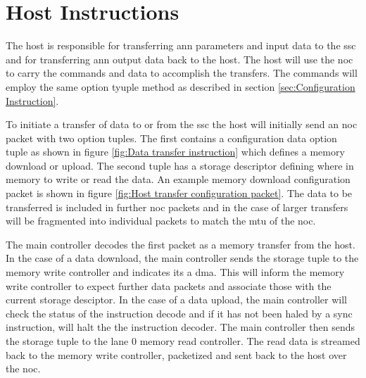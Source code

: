 \section{Host Instructions}
\label{sec:Host Instructions}

The host is responsible for transferring \ac{ann} parameters and input data to the \ac{ssc} and for transferring \ac{ann} output data back to the host.
The host will use the \ac{noc} to carry the commands and data to accomplish the transfers.
The commands will employ the same option tyuple method as described in section \ref{sec:Configuration Instruction}.

To initiate a transfer of data to or from the \ac{ssc} the host will initially send an \ac{noc} packet with two option tuples.
The first contains a configuration data option tuple as shown in figure \ref{fig:Data transfer instruction} which defines a memory download or upload.
The second tuple has a storage descriptor defining where in memory to write or read the data.
An example memory download configuration packet is shown in figure \ref{fig:Host transfer configuration packet}.
The data to be transferred is included in further \ac{noc} packets and in the case of larger transfers will be fragmented into individual packets to match the \ac{mtu} of the \ac{noc}.

The main controller decodes the first packet as a memory transfer from the host. 
In the case of a data download, the main controller sends the storage tuple to the memory write controller and indicates its a \ac{dma}.
This will inform the memory write controller to expect further data packets and associate those with the current storage desciptor.
In the case of a data upload, the main controller will check the status of the instruction decode and if it has not been haled by a sync instruction, will halt the the instruction decoder.
The main controller then sends the storage tuple to the lane 0 memory read controller.
The read data is streamed back to the memory write controller, packetized and sent back to the host over the \ac{noc}.



